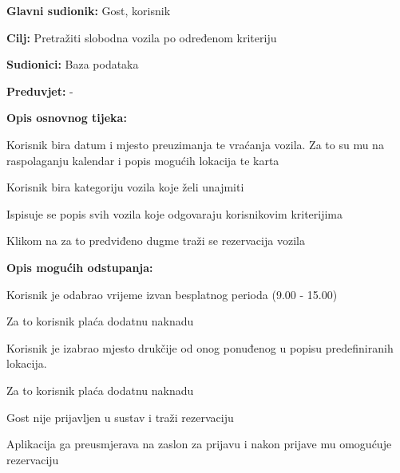 					\noindent {}
					\begin{packed_item}
	
						\item \textbf{Glavni sudionik: }Gost, korisnik
						\item  \textbf{Cilj: }Pretražiti slobodna vozila po određenom kriteriju
						\item  \textbf{Sudionici: }Baza podataka
						\item  \textbf{Preduvjet: }-
						\item  \textbf{Opis osnovnog tijeka:}
						
						\item[] \begin{packed_enum}
							\item Korisnik bira datum i mjesto preuzimanja te vraćanja vozila. Za to su mu na raspolaganju kalendar i popis mogućih lokacija te karta
							\item Korisnik bira kategoriju vozila koje želi unajmiti
							\item Ispisuje se popis svih vozila koje odgovaraju korisnikovim kriterijima
							\item Klikom na za to predviđeno dugme traži se rezervacija vozila
						\end{packed_enum}
						
						\item  \textbf{Opis mogućih odstupanja: }
						
						\item[] \begin{packed_item}
	                        
	                        \item[1.a] Korisnik je odabrao vrijeme izvan besplatnog perioda (9.00 - 15.00)
							\item[] \begin{packed_enum}
								\item Za to korisnik plaća dodatnu naknadu
							\end{packed_enum}
							\item[1.b] Korisnik je izabrao mjesto drukčije od onog ponuđenog u popisu predefiniranih lokacija.
							\item[] \begin{packed_enum}
								\item Za to korisnik plaća dodatnu naknadu
							\end{packed_enum}
							\item[4.a] Gost nije prijavljen u sustav i traži rezervaciju
							\item[] \begin{packed_enum}
								\item Aplikacija ga preusmjerava na zaslon za prijavu i nakon prijave mu omogućuje rezervaciju
							\end{packed_enum}
						\end{packed_item}
						
					\end{packed_item}
					
